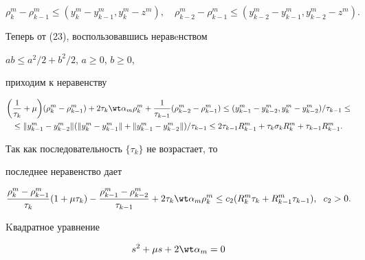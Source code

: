 $$


\rho_k^m -\rho_{k-1}^m \leq (y_k^m-y_{k-1}^m,y_k^m-z^m),\quad


\rho_{k-2}^m -\rho_{k-1}^m \leq (y_{k-2}^m-y_{k-1}^m,y_{k-2}^m-z^m).


$$





Теперь от (23), воспользовавшись неравeнством


$ab\leq a^2/2+b^2/2$, $a\geq 0$, $b \geq 0$,


приходим к неравенству


\begin{multline*}


\bigg(\frac {1}{\tau_k}+\mu \bigg)(\rho_k^m-\rho_{k-1}^m)+2\tau_k\wt


\alpha_m


\rho_k^m +\frac{1}{\tau_{k-1}}(\rho_{k-2}^m-\rho_{k-1}^m)\leq


(y_{k-1}^m-y_{k-2}^m,y_k^m-y_{k-2}^m)/\tau_{k-1} \leq \\


%


\leq \|y_{k-1}^m-y_{k-2}^m\| (\|y_k^m-y_{k-1}^m\|+\|y_{k-1}^m-


y_{k-2}^m\| )/\tau_{k-1} \leq 2\tau_{k-1}R_{k-1}^m+\tau_k\sigma


_kR_k^m+


\tau_{k-1}R_{k-1}^m.


\end{multline*}


Так как последовательность $\{\tau_k\}$ не возрастает, то


последнее неравенство дает


\begin{equation}\label {24}


\frac{\rho_k^m -\rho_{k-1}^m}{\tau_k}(1+\mu \tau_k)-


\frac{\rho_{k-1}^m -\rho_{k-2}^m}{\tau_{k-1}}+2\tau_k


\wt \alpha_m\rho_k^m


\leq c_2(R_k^m\tau_k+R_{k-1}^m\tau_{k-1}),\ \;c_2>0.


\end{equation}


Kвадратное уравнение


\begin{equation}\label {25}


s^2+\mu s+2\wt \alpha_m=0


\end{equation}


